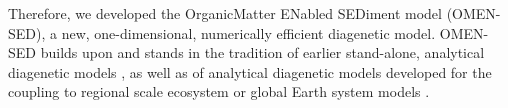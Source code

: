 \documentclass[gmd, manuscript]{copernicus}
\begin{document}


Therefore, we developed the OrganicMatter ENabled SEDiment model (OMEN-SED), a new, one-dimensional, numerically efficient diagenetic model. OMEN-SED builds upon and stands in the tradition of earlier stand-alone, 
analytical diagenetic models \citep{vanderborght_kinetic_1977, billen1982idealized, goloway_diagenetic_1982, boudreau_modelling_1991}, as well as of analytical diagenetic models developed for the coupling to regional scale ecosystem or global 
Earth system models \citep{ruardij_benthic_1995, tromp_global_1995, heinze_global_1999, gypens_simple_2008}.
\end{document}

